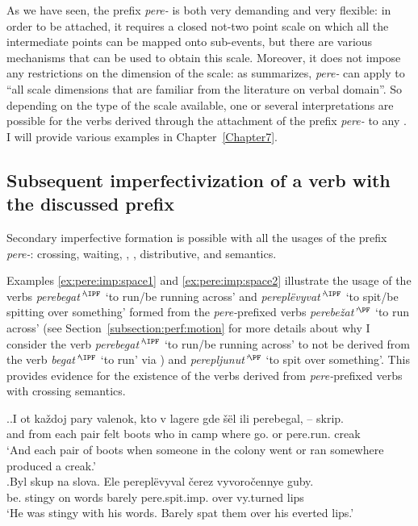 As we have seen, the prefix \textit{pere-} is both very demanding and very flexible: in order to be attached, it requires a closed not-two point scale on which all the intermediate points can be mapped onto sub-events, but there are various mechanisms that can be used to obtain this scale. Moreover, it does not impose any restrictions on the dimension of the scale: as \citet[151]{Kagan:book} summarizes, \textit{pere-} can apply to ``all scale dimensions that are familiar from the literature on verbal domain''. So depending on the type of the scale available, one or several interpretations are possible for the verbs derived through the attachment of the prefix \textit{pere-} to any . I will provide various examples in Chapter~\ref{Chapter7}.

\subsection{Subsequent imperfectivization of a verb with the discussed prefix}
Secondary imperfective formation is possible with all the usages of the prefix \textit{pere-}: crossing, waiting, , , distributive, and  semantics.

Examples \ref{ex:pere:imp:space1} and \ref{ex:pere:imp:space2} illustrate the usage of the  verbs \textit{perebegat'}$^{\IPF}$ `to run/be running across' and \textit{perepl\"{e}vyvat'}$^{\IPF}$ `to spit/be spitting over something' formed from the \textit{pere-}prefixed verbs \textit{perebe\v{z}at'}$^{\PF}$ `to run across' (see Section~\ref{subsection:perf:motion} for more details about why I consider the verb \textit{pe\-re\-be\-gat'}$^{\IPF}$ `to run/be running across' to not be derived from the verb \textit{begat'}$^{\IPF}$ `to run' via ) and \textit{perepljunut'}$^{\PF}$ `to spit over something'. This provides evidence for the existence of the  verbs derived from \textit{pere-}prefixed verbs with crossing semantics.

\ex.\ag.\label{ex:pere:imp:space1}I ot ka\v{z}doj pary valenok, kto v lagere gde \v{s}\"{e}l ili perebegal, -- skrip.\\
and from each pair {felt boots} who in camp where go. or pere.run. {} creak\\
\trans `And each pair of boots when someone in the colony went or ran somewhere produced a creak.'\\
\bg.\label{ex:pere:imp:space2}Byl skup na slova. Ele perepl\"{e}vyval \v{c}erez vyvoro\v{c}ennye guby.\\
be. stingy on words barely pere.spit.imp. over vy.turned lips\\
\trans `He was stingy with his words. Barely spat them over his everted lips.'\\

